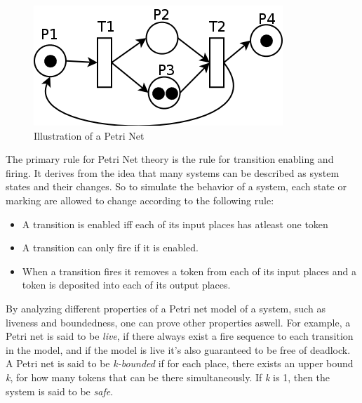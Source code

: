 \begin{figure}[h]
    \includegraphics[scale=0.5]{include/figures/petri_net}
    \caption{Illustration of a Petri Net}
    \label{fig:petri_net}
\end{figure}

The primary rule for Petri Net theory is the rule for transition enabling and firing. It derives from the idea that many systems can be described as system states and their changes. So to simulate the behavior of a system, each state or marking are allowed to change according to the following rule:\\

\begin{itemize}
	\setlength\itemsep{1em}
	\item A transition is enabled iff each of its input places has atleast one token
	\item A transition can only fire if it is enabled.
	\item When a transition fires it removes a token from each of its input places and a token is deposited into each of its output places.\\
\end{itemize}


By analyzing different properties of a Petri net model of a system, such as liveness and boundedness, one can prove other properties aswell. For example, a Petri net is said to be \textit{live}, if there always exist a fire sequence to each transition in the model, and if the model is live it's also guaranteed to be free of deadlock\cite{ramamoorthy1980performance}. A Petri net is said to be \textit{k-bounded} if for each place, there exists an upper bound \textit{k}, for how many tokens that can be there simultaneously. If \textit{k} is 1, then the system is said to be \textit{safe}. %

